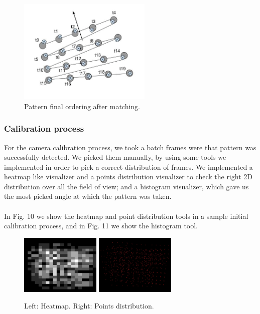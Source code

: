 \documentclass[journal]{IEEEtran}
\begin{document}
\begin{figure}[H]
\centering
\includegraphics[width=2.5in]{_img/img_report3_pattern_order_check.jpg}
\caption{Pattern final ordering after matching.}
\end{figure}

\subsubsection{Calibration process}
For the camera calibration process, we took a batch frames were that pattern was successfully detected. We picked them manually, by using some tools we implemented in order to pick a correct distribution of frames. We implemented a heatmap like visualizer and a points distribution visualizer to check the right 2D distribution over all the field of view; and a histogram visualizer, which gave us the most picked angle at which the pattern was taken.
\\
\\
In Fig. 10 we show the heatmap and point distribution tools in a sample initial calibration process, and in Fig. 11 we show the histogram tool.

\begin{figure}[H]
\centering
\includegraphics[width=1.5in]{_img/img_report3_heatmap.png}
\includegraphics[width=1.5in]{_img/img_report3_points_distribution.png}
\caption{Left: Heatmap. Right: Points distribution.}
\end{figure}
\end{document}
